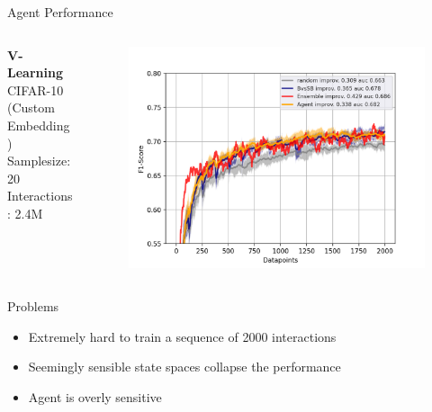 \documentclass[aspectratio=169, 11pt, invertlogo]{ismll-slides}
\begin{document}
\begin{frame}[fragile]{Agent Performance}
	\begin{columns}
		\begin{column}{.3\linewidth}
			\textbf{V-Learning} \\ [1mm]
			CIFAR-10 (Custom Embedding) \\ [1mm]
			Samplesize: 20 \\ [1mm]
			Interactions: 2.4M \\ [1mm]
		\end{column}
		\begin{column}{.65\linewidth}
			\begin{figure}
				\centering
				\includegraphics[width=\linewidth]{pics/eval_CIFAR10.png}
			\end{figure}
		\end{column}
	\end{columns}
\end{frame}




\begin{frame}[fragile]{Problems}
	\begin{itemize}
		\item Extremely hard to train a sequence of 2000 interactions
		\item Seemingly sensible state spaces collapse the performance
		\item Agent is overly sensitive
	\end{itemize}
\end{frame}
\end{document}
